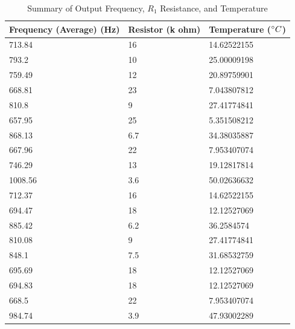 \begin{table}[H]
	\centering
	\begin{tabular}{|l|l|l|}
		\hline
		\textbf{Frequency (Average) (Hz)} & \textbf{Resistor (k ohm)} & \textbf{Temperature ($\degree C$)} \\ \hline
		713.84                  & 16                        & 14.62522155              \\ \hline
		793.2                   & 10                        & 25.00009198              \\ \hline
		759.49                  & 12                        & 20.89759901              \\ \hline
		668.81                  & 23                        & 7.043807812              \\ \hline
		810.8                   & 9                         & 27.41774841              \\ \hline
		657.95                  & 25                        & 5.351508212              \\ \hline
		868.13                  & 6.7                       & 34.38035887              \\ \hline
		667.96                  & 22                        & 7.953407074              \\ \hline
		746.29                  & 13                        & 19.12817814              \\ \hline
		1008.56                 & 3.6                       & 50.02636632              \\ \hline
		712.37                  & 16                        & 14.62522155              \\ \hline
		694.47                  & 18                        & 12.12527069              \\ \hline
		885.42                  & 6.2                       & 36.2584574               \\ \hline
		810.08                  & 9                         & 27.41774841              \\ \hline
		848.1                   & 7.5                       & 31.68532759              \\ \hline
		695.69                  & 18                        & 12.12527069              \\ \hline
		694.83                  & 18                        & 12.12527069              \\ \hline
		668.5                   & 22                        & 7.953407074              \\ \hline
		984.74                  & 3.9                       & 47.93002289              \\ \hline
	\end{tabular}
	\caption{Summary of Output Frequency, $R_1$ Resistance, and Temperature}
	\label{psocalibrationsummary}
\end{table}

